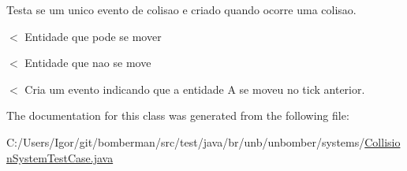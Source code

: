 Testa se um unico evento de colisao e criado quando ocorre uma colisao. 

$<$ Entidade que pode se mover

$<$ Entidade que nao se move

$<$ Cria um evento indicando que a entidade A se moveu no tick anterior. 

The documentation for this class was generated from the following file\+:\begin{DoxyCompactItemize}
\item 
C\+:/\+Users/\+Igor/git/bomberman/src/test/java/br/unb/unbomber/systems/\hyperlink{_collision_system_test_case_8java}{Collision\+System\+Test\+Case.\+java}\end{DoxyCompactItemize}
